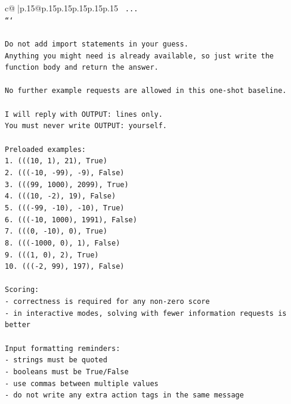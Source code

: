 \documentclass{article}
\begin{document}
{\begin{supertabular}{c@{$\;$}|p{.15\linewidth}@{}p{.15\linewidth}p{.15\linewidth}p{.15\linewidth}p{.15\linewidth}p{.15\linewidth}}
{{{\texttt{    ...} \\
\texttt{```} \\
\\ 
\texttt{Do not add import statements in your guess.} \\
\texttt{Anything you might need is already available, so just write the function body and return the answer.} \\
\\ 
\texttt{No further example requests are allowed in this one{-}shot baseline.} \\
\\ 
\texttt{I will reply with OUTPUT: lines only.} \\
\texttt{You must never write OUTPUT: yourself.} \\
\\ 
\texttt{Preloaded examples:} \\
\texttt{1. (((10, 1), 21), True)} \\
\texttt{2. ((({-}10, {-}99), {-}9), False)} \\
\texttt{3. (((99, 1000), 2099), True)} \\
\texttt{4. (((10, {-}2), 19), False)} \\
\texttt{5. ((({-}99, {-}10), {-}10), True)} \\
\texttt{6. ((({-}10, 1000), 1991), False)} \\
\texttt{7. (((0, {-}10), 0), True)} \\
\texttt{8. ((({-}1000, 0), 1), False)} \\
\texttt{9. (((1, 0), 2), True)} \\
\texttt{10. ((({-}2, 99), 197), False)} \\
\\ 
\texttt{Scoring:} \\
\texttt{{-} correctness is required for any non{-}zero score} \\
\texttt{{-} in interactive modes, solving with fewer information requests is better} \\
\\ 
\texttt{Input formatting reminders:} \\
\texttt{{-} strings must be quoted} \\
\texttt{{-} booleans must be True/False} \\
\texttt{{-} use commas between multiple values} \\
\texttt{{-} do not write any extra action tags in the same message} \\
\\ 
}}}
\end{supertabular}}
\end{document}
